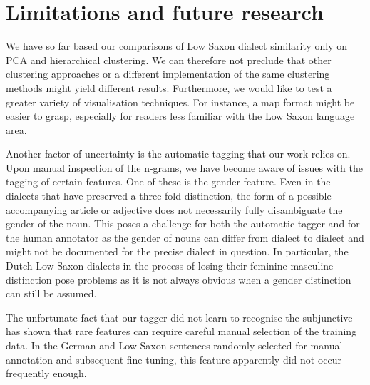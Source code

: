 \documentclass[output=paper,colorlinks,citecolor=brown]{langscibook}
\begin{document}
\section{Limitations and future research}

We have so far based our comparisons of Low Saxon dialect similarity only on PCA and hierarchical clustering. We can therefore not preclude that other clustering approaches or a different implementation of the same clustering methods might yield different results. Furthermore, we would like to test a greater variety of visualisation techniques. For instance, a map format might be easier to grasp, especially for readers less familiar with the Low Saxon language area.

Another factor of uncertainty is the automatic tagging that our work relies on. 
Upon manual inspection of the n-grams, we have become aware of issues with the tagging of certain features. One of these is the gender feature. Even in the dialects that have preserved a three-fold distinction, the form of a possible accompanying article or adjective does not necessarily fully disambiguate the gender of the noun. This poses a challenge for both the automatic tagger and for the human annotator as the gender of nouns can differ from dialect to dialect and might not be documented for the precise dialect in question. 
In particular, the Dutch Low Saxon dialects in the process of losing their feminine-masculine distinction pose problems as it is not always obvious when a gender distinction can still be assumed. 



The unfortunate fact that our tagger did not learn to recognise the subjunctive has shown that rare features can require careful manual selection of the training data. In the German and Low Saxon sentences randomly selected for manual annotation and subsequent fine-tuning, this feature apparently did not occur frequently enough. 
\end{document}

